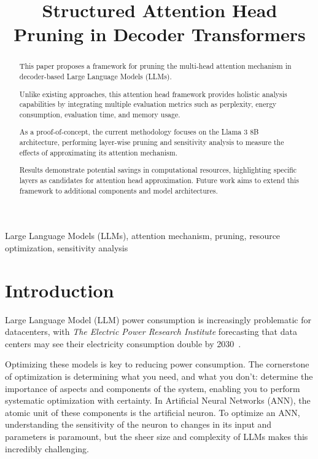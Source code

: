 \documentclass[conference]{IEEEtran}
\begin{document}
    \title{Structured Attention Head Pruning in Decoder Transformers}

    \author{
    }

    \maketitle

    \begin{abstract}
        This paper proposes a framework for pruning the multi-head attention mechanism in decoder-based Large Language Models (LLMs).

        Unlike existing approaches, this attention head framework provides holistic analysis capabilities by integrating multiple evaluation metrics such as perplexity, energy consumption, evaluation time, and memory usage.

        As a proof-of-concept, the current methodology focuses on the Llama 3 8B architecture, performing layer-wise pruning and sensitivity analysis to measure the effects of approximating its attention mechanism.

        Results demonstrate potential savings in computational resources, highlighting specific layers as candidates for attention head approximation.
        Future work aims to extend this framework to additional components and model architectures.
    \end{abstract}

    \begin{IEEEkeywords}
        Large Language Models (LLMs), attention mechanism, pruning, resource optimization, sensitivity analysis
    \end{IEEEkeywords}

    \section{Introduction}
    Large Language Model (LLM) power consumption is increasingly problematic for datacenters, with \textit{The Electric Power
    Research Institute} forecasting that data centers may see their electricity consumption double by
    2030~\cite{kindig2024}.

    Optimizing these models is key to reducing power consumption.
    The cornerstone of optimization is determining what you need, and what you don't: determine the importance of
    aspects and components of the system, enabling you to perform systematic optimization with certainty.
    In Artificial Neural Networks (ANN), the atomic unit of these components is the artificial neuron.
    To optimize an ANN, understanding the sensitivity of the neuron to changes in its input and parameters is paramount,
    but the sheer size and complexity of LLMs makes this incredibly challenging.
\end{document}
